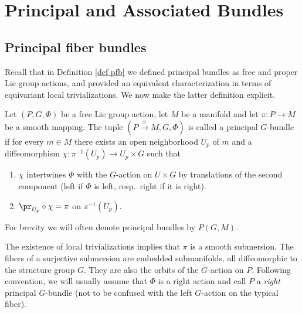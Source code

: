 
\section{Principal and Associated Bundles}

\subsection{Principal fiber bundles}\label{sec: principal bundles}


Recall that in Definition \ref{def pfb} we defined principal bundles as free and proper Lie group actions, and provided an equivalent characterization in terms of equivariant local trivializations. We now make the latter definition explicit.

\begin{defn}\label{def pfb 2}
    Let $(P,G,\Phi)$ be a free Lie group action, let $M$ be a manifold and let $\pi:P\to M$ be a smooth mapping. The tuple $(P\overset{\pi}{\to}M,G,\Phi)$ is called a principal $G$-bundle if for every $m\in M$ there exists an open neighborhood $U_p$ of $m$ and a diffeomorphism $\chi:\pi^{-1}(U_p)\to U_p\times G$ such that
    \begin{enumerate}
        \item $\chi$ intertwines $\Phi$ with the $G$-action on $U\times G$ by translations of the second component (left if $\Phi$ is left, resp.\ right if it is right).
        \item $\pr_{U_p}\circ \chi=\pi$ on $\pi^{-1}(U_p)$.
    \end{enumerate}
    For brevity we will often denote principal bundles by $P(G,M)$.
\end{defn}

The existence of local trivializations implies that $\pi$ is a smooth submersion. The fibers of a surjective submersion are embedded submanifolds, all diffeomorphic to the structure group $G$. They are also the orbits of the $G$-action on $P$. Following convention, we will usually assume that $\Phi$ is a right action and call $P$ a \emph{right} principal $G$-bundle (not to be confused with the left $G$-action on the typical fiber).

